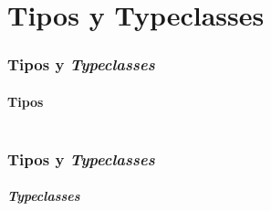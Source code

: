\section{Tipos y Typeclasses}
\begin{frame}[fragile]
  \frametitle{Tipos y \emph{Typeclasses}}
  \framesubtitle{Tipos}
  {\color{white}
    \inputminted[bgcolor=bg]{haskell}{code/tipos.hs}
  }
\end{frame}

\begin{frame}[fragile]
  \frametitle{Tipos y \emph{Typeclasses}}
  \framesubtitle{\emph{Typeclasses}}
  {\color{white}
    \inputminted[bgcolor=bg]{haskell}{code/typeclass.hs}
  }
\end{frame}